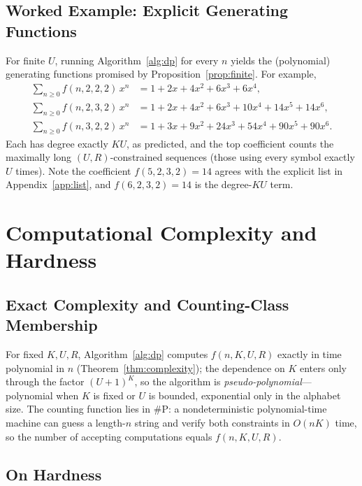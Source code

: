 \documentclass[a4paper,12pt]{article}
\begin{document}
\subsection{Worked Example: Explicit Generating Functions}

For finite $U$, running Algorithm~\ref{alg:dp} for every $n$ yields the
(polynomial) generating functions promised by
Proposition~\ref{prop:finite}. For example,
\begin{align}
\sum_{n\ge0} f(n,2,2,2)\,x^n &= 1+2x+4x^2+6x^3+6x^4,\\
\sum_{n\ge0} f(n,2,3,2)\,x^n &= 1+2x+4x^2+6x^3+10x^4+14x^5+14x^6,\\
\sum_{n\ge0} f(n,3,2,2)\,x^n &= 1+3x+9x^2+24x^3+54x^4+90x^5+90x^6.
\end{align}
Each has degree exactly $KU$, as predicted, and the top coefficient
counts the maximally long $(U,R)$-constrained sequences (those using
every symbol exactly $U$ times). Note the coefficient
$f(5,2,3,2)=14$ agrees with the explicit list in
Appendix~\ref{app:list}, and $f(6,2,3,2)=14$ is the degree-$KU$ term.

\section{Computational Complexity and Hardness}
\label{sec:complexity}

\subsection{Exact Complexity and Counting-Class Membership}

For fixed $K,U,R$, Algorithm~\ref{alg:dp} computes $f(n,K,U,R)$ exactly
in time polynomial in $n$ (Theorem~\ref{thm:complexity}); the
dependence on $K$ enters only through the factor $(U+1)^K$, so the
algorithm is \emph{pseudo-polynomial}---polynomial when $K$ is fixed or
$U$ is bounded, exponential only in the alphabet size.  The counting
function lies in $\#\mathrm{P}$: a nondeterministic polynomial-time
machine can guess a length-$n$ string and verify both constraints in
$O(nK)$ time, so the number of accepting computations equals
$f(n,K,U,R)$.

\subsection{On Hardness}
\end{document}
